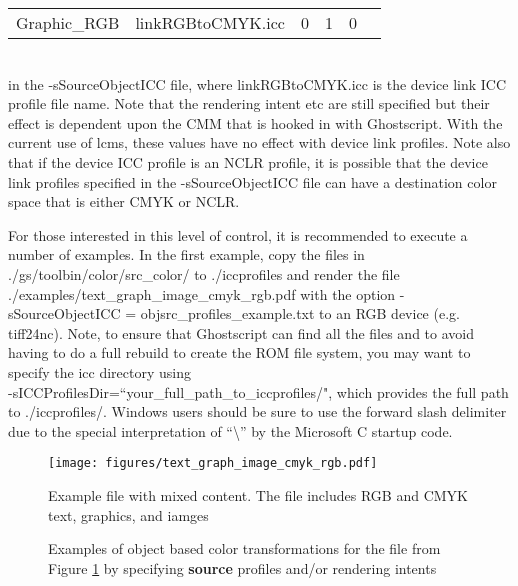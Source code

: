 \documentclass[12pt,notitlepage]{article}
\begin{document}
\begin{tabular}{llllll}
Graphic\_RGB &	linkRGBtoCMYK.icc	& 0 & 1 & 0 & \\
\end{tabular}\\

\noindent in the -sSourceObjectICC file, where linkRGBtoCMYK.icc is the device link ICC profile file name.  Note that the rendering intent etc are still specified but their effect is dependent upon the CMM that is hooked in with Ghostscript.  With the current use of lcms, these values have no effect with device link profiles.   Note also that if the device ICC profile is an NCLR profile, it is possible that the device link profiles specified in the -sSourceObjectICC file can have a destination color space that is either CMYK or NCLR.

For those interested in this level of control, it is recommended to execute a number of examples.
In the first example, copy the files in ./gs/toolbin/color/src\_color/ to ./iccprofiles and render the file ./examples/text\_graph\_image\_cmyk\_rgb.pdf with the option -sSourceObjectICC = objsrc\_profiles\_example.txt to an RGB device (e.g. tiff24nc).  Note, to ensure that Ghostscript can find all the files and to avoid having to do a full rebuild to create the ROM file system, you may want to specify the icc directory using\\
 -sICCProfilesDir=``your\_full\_path\_to\_iccprofiles/", which provides the full path to ./iccprofiles/.   Windows users should be sure to use the forward slash delimiter due to the special interpretation of ``\textbackslash'' by the Microsoft C startup code.

\begin{figure}
    \begin{center}
\texttt{[image: figures/text\_graph\_image\_cmyk\_rgb.pdf]}
    \end{center}
   \caption{Example file with mixed content. The file includes RGB and CMYK text, graphics, and iamges}
    \label{fig:normal}
\end{figure}

\begin{figure}
    \caption{Examples of object based color transformations for the file from Figure \ref{fig:normal} by specifying {\bf source} profiles and/or rendering intents}
\end{figure}
\end{document}
